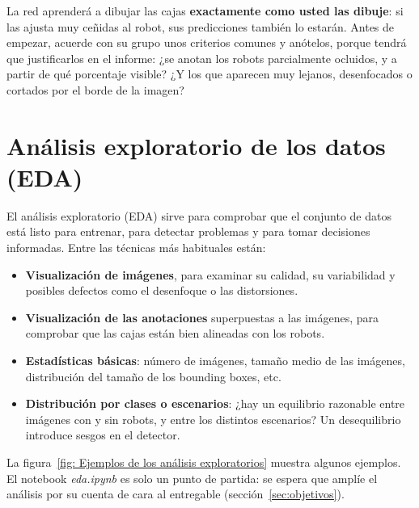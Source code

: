 \documentclass[12pt,a4paper]{article}
\begin{document}
La red aprenderá a dibujar las cajas \textbf{exactamente como usted las dibuje}: si las ajusta muy ceñidas al robot, sus predicciones también lo estarán. Antes de empezar, acuerde con su grupo unos criterios comunes y anótelos, porque tendrá que justificarlos en el informe: ¿se anotan los robots parcialmente ocluidos, y a partir de qué porcentaje visible? ¿Y los que aparecen muy lejanos, desenfocados o cortados por el borde de la imagen?


\section{Análisis exploratorio de los datos (EDA)}

El análisis exploratorio (EDA) sirve para comprobar que el conjunto de datos está listo para entrenar, para detectar problemas y para tomar decisiones informadas. Entre las técnicas más habituales están:

\begin{itemize}
    \item \textbf{Visualización de imágenes}, para examinar su calidad, su variabilidad y posibles defectos como el desenfoque o las distorsiones.
    \item \textbf{Visualización de las anotaciones} superpuestas a las imágenes, para comprobar que las cajas están bien alineadas con los robots.
    \item \textbf{Estadísticas básicas}: número de imágenes, tamaño medio de las imágenes, distribución del tamaño de los bounding boxes, etc.
    \item \textbf{Distribución por clases o escenarios}: ¿hay un equilibrio razonable entre imágenes con y sin robots, y entre los distintos escenarios? Un desequilibrio introduce sesgos en el detector.
\end{itemize}

La figura~\ref{fig: Ejemplos de los análisis exploratorios} muestra algunos ejemplos. El notebook \textit{eda.ipynb} es solo un punto de partida: se espera que amplíe el análisis por su cuenta de cara al entregable (sección~\ref{sec:objetivos}).
\end{document}
